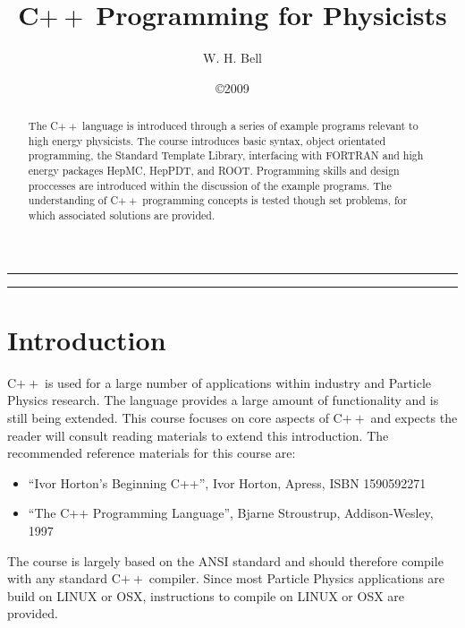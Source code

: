 \documentclass[11pt,a4paper]{scrartcl}
\def\cpp{C$++\;$}
\begin{document}
\title{\cpp Programming for Physicists}
\author{W. H. Bell}
\date{
\copyright 2009
}

\maketitle
\hrule
\vspace{0.2cm}
\begin{abstract}

The \cpp language is introduced through a series of example programs
relevant to high energy physicists.  The course introduces basic
syntax, object orientated programming, the Standard Template Library,
interfacing with FORTRAN and high energy packages HepMC, HepPDT,
and ROOT.  Programming skills and design proccesses are introduced
within the discussion of the example programs.  The understanding of
\cpp programming concepts is tested though set problems, for which
associated solutions are provided.

\end{abstract}
\vspace{0.2cm}
\hrule

\clearpage
\newpage

\tableofcontents

\clearpage
\newpage

\pagestyle{fancy}

\section{Introduction}

\cpp is used for a large number of applications within industry and
Particle Physics research.  The language provides a large amount of
functionality and is still being extended.  This course focuses on
core aspects of \cpp and expects the reader will consult reading
materials to extend this introduction.  The recommended reference
materials for this course are:
%
\begin{itemize}
\item ``Ivor Horton's Beginning C++'', Ivor Horton, Apress, ISBN 1590592271
\item ``The C++ Programming Language'', Bjarne Stroustrup, Addison-Wesley, 1997
\end{itemize}
%
The course is largely based on the ANSI standard and should therefore
compile with any standard \cpp compiler.  Since most Particle Physics
applications are build on LINUX or OSX, instructions to compile on
LINUX or OSX are provided.
\end{document}
